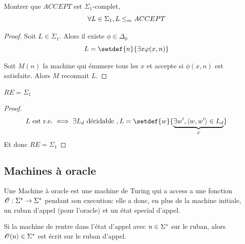 \begin{exercice}
	Montrer que $ACCEPT$ est $\Sigma_1$-complet, \ie
	$$ \forall L \in \Sigma_1, L \leq_m ACCEPT $$
\end{exercice}

\begin{proof}

	Soit $L \in \Sigma_1$. Alors il existe $\phi \in \Delta_0$ \tq
	$$ L = \setdef {n} {\exists x \phi(x,n)} $$

	Soit $M(n)$ la machine qui énumere tous les $x$ et accepte si $\phi(x,n)$ est satisfaite.
	Alors $M$ reconnait $L$.
\end{proof}


\iffalse
	\begin{prop}
		$L$ est r.e. $\implies L \in \Sigma_1$.
	\end{prop}

	\begin{proof}
		\begin{eqnarray*}
			L \text{ est r.e.} &\iff& (\forall w, w \in L \iff \exists x, eval (\encode M,w,x) = 1)\\
			&\implies& L \in \Sigma_1
		\end{eqnarray*}
	\end{proof}
\fi


\begin{prop}
	$RE = \Sigma_1$
\end{prop}

\begin{proof}
	$$L \text{ est r.e.} \iff \exists L_d \text{ décidable }, L = \setdef {w} {\underbrace{\exists w', \encode {w, w'} \in L_d}_{\phi}}$$
	Et donc $RE = \Sigma_1$
\end{proof}

\subsection{Machines à oracle}

\begin{definition}
	Une Machine à oracle est une machine de Turing qui a access a une fonction $\mathscr O : \Sigma^{*} \to \Sigma^{*}$ pendant son execution: elle a donc, en plus de la machine
	initiale, un ruban d'appel (pour l'oracle) et un état special d'appel.

	Si la machine de rentre dans l'état d'appel avec $u \in \Sigma^{*}$ sur le ruban, alors $\mathscr O (u) \in \Sigma^{*}$ est écrit sur le ruban d'appel.
\end{definition}

